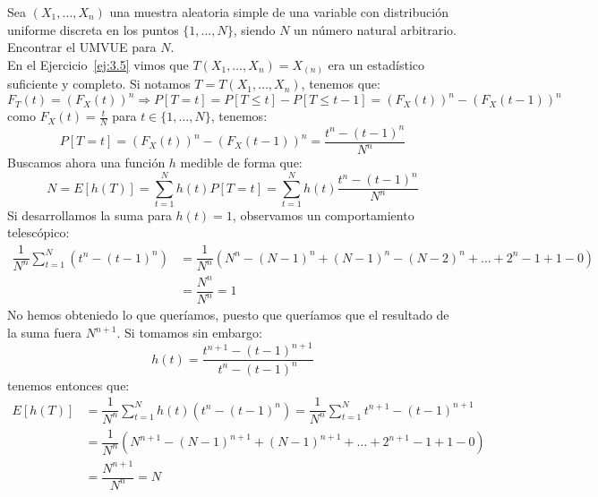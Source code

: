 \begin{ejercicio}
    Sea $(X_1, \ldots, X_n)$ una muestra aleatoria simple de una variable con distribución uniforme discreta en los puntos $\{1,\ldots,N\}$, siendo $N$ un número natural arbitrario. Encontrar el UMVUE para $N$.\\

    \noindent
    En el Ejercicio~\ref{ej:3.5} vimos que $T(X_1, \ldots, X_n) = X_{(n)}$ era un estadístico suficiente y completo. Si notamos $T = T(X_1,\ldots, X_n)$, tenemos que:
    \begin{equation*}
        F_T(t) = {(F_X(t))}^{n} \Longrightarrow P[T=t] = P[T\leq t] - P[T\leq t-1] = {(F_X(t))}^{n}-{(F_X(t-1))}^{n}
    \end{equation*}
    como $F_X(t) = \frac{t}{N}$ para $t\in \{1,\ldots,N\}$, tenemos:
    \begin{equation*}
        P[T=t] = {(F_X(t))}^{n}-{(F_X(t-1))}^{n} = \dfrac{t^n - {(t-1)}^{n}}{N^n}
    \end{equation*} 
    Buscamos ahora una función $h$ medible de forma que:
    \begin{equation*}
        N = E[h(T)] = \sum_{t=1}^{N}h(t) P[T=t] = \sum_{t=1}^{N}h(t)\dfrac{t^n-{(t-1)}^{n}}{N^n}
    \end{equation*}
    Si desarrollamos la suma para $h(t) = 1$, observamos un comportamiento telescópico:
    \begin{align*}
        \dfrac{1}{N^n}\sum_{t=1}^{N}(t^n - {(t-1)}^{n}) &= \dfrac{1}{N^n}(N^n - {(N-1)}^{n} + {(N-1)}^{n} - {(N-2)}^{n} + \ldots + 2^n - 1 + 1 - 0) \\
                                                        &= \dfrac{N^n}{N^n} = 1
    \end{align*}
    No hemos obteniedo lo que queríamos, puesto que queríamos que el resultado de la suma fuera $N^{n+1}$. Si tomamos sin embargo:
    \begin{equation*}
        h(t) = \dfrac{t^{n+1}-{(t-1)}^{n+1}}{t^n - {(t-1)}^{n}}
    \end{equation*}
    tenemos entonces que:
    \begin{align*}
        E[h(T)] &= \dfrac{1}{N^n}\sum_{t=1}^{N}h(t) (t^n-{(t-1)}^{n}) = \dfrac{1}{N^n}\sum_{t=1}^{N}t^{n+1}-{(t-1)}^{n+1} \\
                &= \dfrac{1}{N^n}(N^{n+1}-{(N-1)}^{n+1} + {(N-1)}^{n+1} + \ldots + 2^{n+1} - 1 + 1 -0) \\ 
                &= \dfrac{N^{n+1}}{N^n} = N
    \end{align*}

\end{ejercicio}
